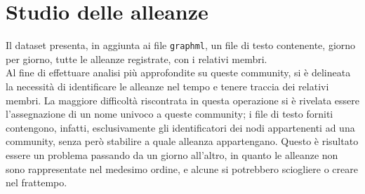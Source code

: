 \section{Studio delle alleanze}
Il dataset presenta, in aggiunta ai file \texttt{graphml}, un file di testo contenente, giorno per giorno, tutte le alleanze registrate, con i relativi membri.\\
Al fine di effettuare analisi più approfondite su queste community, si è delineata la necessità di identificare le alleanze nel tempo e tenere traccia dei relativi membri.
La maggiore difficoltà riscontrata in questa operazione si è rivelata essere l'assegnazione di un nome univoco a queste community; i file di testo forniti contengono, infatti, esclusivamente gli identificatori dei nodi appartenenti ad una community, senza però stabilire a quale alleanza appartengano.
Questo è risultato essere un problema passando da un giorno all'altro, in quanto le alleanze non sono rappresentate nel medesimo ordine, e alcune si potrebbero sciogliere o creare nel frattempo.

